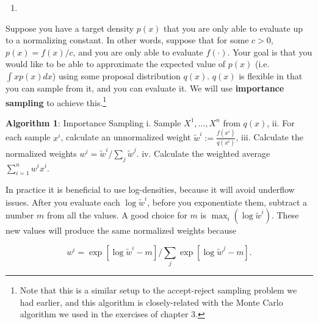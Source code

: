 \documentclass[12pt,krantz2]{krantz}
\begin{document}
\begin{enumerate}
\def\labelenumi{\arabic{enumi}.}
\setcounter{enumi}{9}
\item
\end{enumerate}

Suppose you have a target density \(p(x)\) that you are only able to evaluate up to a normalizing constant. In other words, suppose that for some \(c > 0\), \(p(x) = f(x) / c\), and you are only able to evaluate \(f(\cdot)\). Your goal is that you would like to be able to approximate the expected value of \(p(x)\) (i.e.~\(\int x p(x) dx\)) using some proposal distribution \(q(x)\). \(q(x)\) is flexible in that you can sample from it, and you can evaluate it. We will use \textbf{importance sampling} \citep{impsamping1} \citep{impsamping2} to achieve this.\footnote{Note that this is a similar setup to the accept-reject sampling problem we had earlier, and this algorithm is closely-related with the Monte Carlo algorithm we used in the exercises of chapter 3.}

\textbf{Algorithm 1}: Importance Sampling
i. Sample \(X^1, \ldots, X^n\) from \(q(x)\),
ii. For each sample \(x^i\), calculate an unnormalized weight \(\tilde{w}^i:= \frac{f(x^i)}{q(x^i)}\),
iii. Calculate the normalized weights \(w^i = \tilde{w}^i \bigg/ \sum_j \tilde{w}^j\).
iv. Calculate the weighted average \(\sum_{i=1}^n w^i x^i\).

In practice it is beneficial to use log-densities, because it will avoid underflow issues. After you evaluate each \(\log \tilde{w}^i\), before you exponentiate them, subtract a number \(m\) from all the values. A good choice for \(m\) is \(\max_i (\log \tilde{w}^i)\). These new values will produce the same normalized weights because

\begin{equation} 
w^i = \exp[ \log \tilde{w}^i - m] \bigg/ \sum_j \exp[\log \tilde{w}^j - m].
\end{equation}
\end{document}
